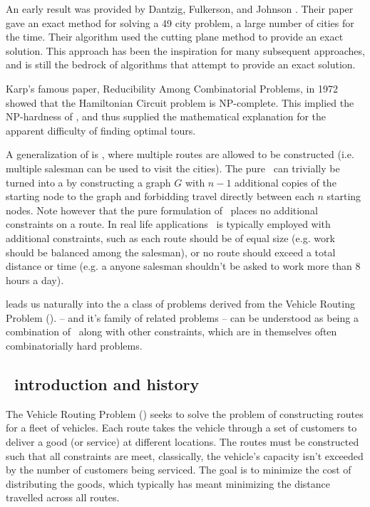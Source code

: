 An early result was provided by Dantzig, Fulkerson, and  Johnson \cite{Dantzig:1954}. Their paper gave an exact method for solving a 49 city problem, a large number of cities for the time. Their algorithm used the cutting plane method to provide an exact solution. This approach has been the inspiration for many subsequent approaches, and is still the bedrock of algorithms that attempt to provide an exact solution.  

Karp's famous paper, Reducibility Among Combinatorial Problems, in 1972 showed that the Hamiltonian Circuit problem is NP-complete. This implied the NP-hardness of \TSP, and thus supplied the mathematical explanation for the apparent difficulty of finding optimal tours.

A generalization of \TSP is \MTSP, where multiple routes are allowed to be constructed (i.e. multiple salesman can be used to visit the cities). The pure \MTSP\ can trivially be turned into a \TSP by constructing a graph $G$ with $n - 1$ additional copies of the starting node to the graph and forbidding travel directly between each $n$ starting nodes. Note however that the pure formulation of \MTSP\ places no additional constraints on a route. In real life applications \MTSP\ is typically employed with additional constraints, such as each route should be of equal size (e.g. work should be balanced among the salesman), or no route should exceed a total distance or time (e.g. a anyone salesman shouldn't be asked to work more than 8 hours a day). 

\MTSP leads us naturally into the a class of problems derived from the Vehicle Routing Problem (\VRP). \VRP -- and it's family of related problems -- can be understood as being a combination of \MTSP\ along with  other constraints, which are in themselves often combinatorially hard problems.    

\subsection{\VRP\ introduction and history}
The Vehicle Routing Problem (\VRP) seeks to solve the problem of constructing routes for a fleet of vehicles. Each route takes the vehicle through a set of customers to deliver a good (or service) at different locations. The routes must be constructed such that all constraints are meet, classically, the vehicle's capacity isn't exceeded by the number of customers being serviced. The goal is to minimize the cost of distributing the goods, which typically has meant minimizing the distance travelled across all routes.

